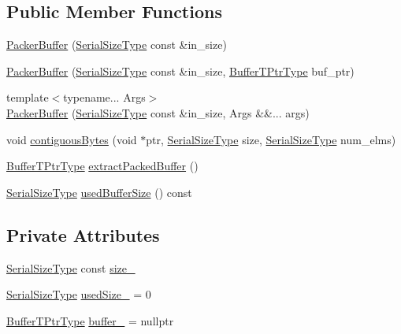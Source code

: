 \subsection*{Public Member Functions}
\begin{DoxyCompactItemize}
\item 
\hyperlink{structcheckpoint_1_1_packer_buffer_abd97aedeba81d8570fa047f3efb4220d}{Packer\+Buffer} (\hyperlink{namespacecheckpoint_a083f6674da3f94c2901b18c6d238217c}{Serial\+Size\+Type} const \&in\+\_\+size)
\item 
\hyperlink{structcheckpoint_1_1_packer_buffer_a4bdbbf8f84eb065c5c0b02d39a480308}{Packer\+Buffer} (\hyperlink{namespacecheckpoint_a083f6674da3f94c2901b18c6d238217c}{Serial\+Size\+Type} const \&in\+\_\+size, \hyperlink{structcheckpoint_1_1_packer_buffer_a081ec628050e8b173e413271fa070c26}{Buffer\+T\+Ptr\+Type} buf\+\_\+ptr)
\item 
{\footnotesize template$<$typename... Args$>$ }\\\hyperlink{structcheckpoint_1_1_packer_buffer_aded90d4aacc6376a95579d249751496d}{Packer\+Buffer} (\hyperlink{namespacecheckpoint_a083f6674da3f94c2901b18c6d238217c}{Serial\+Size\+Type} const \&in\+\_\+size, Args \&\&... args)
\item 
void \hyperlink{structcheckpoint_1_1_packer_buffer_aa8bf2d721f834a607a48164086aec078}{contiguous\+Bytes} (void $\ast$ptr, \hyperlink{namespacecheckpoint_a083f6674da3f94c2901b18c6d238217c}{Serial\+Size\+Type} size, \hyperlink{namespacecheckpoint_a083f6674da3f94c2901b18c6d238217c}{Serial\+Size\+Type} num\+\_\+elms)
\item 
\hyperlink{structcheckpoint_1_1_packer_buffer_a081ec628050e8b173e413271fa070c26}{Buffer\+T\+Ptr\+Type} \hyperlink{structcheckpoint_1_1_packer_buffer_abc144f3a5d61a7eb886bd57241e7ed7e}{extract\+Packed\+Buffer} ()
\item 
\hyperlink{namespacecheckpoint_a083f6674da3f94c2901b18c6d238217c}{Serial\+Size\+Type} \hyperlink{structcheckpoint_1_1_packer_buffer_a15b3ac40c21710da2f9813579c9a9c0e}{used\+Buffer\+Size} () const
\end{DoxyCompactItemize}
\subsection*{Private Attributes}
\begin{DoxyCompactItemize}
\item 
\hyperlink{namespacecheckpoint_a083f6674da3f94c2901b18c6d238217c}{Serial\+Size\+Type} const \hyperlink{structcheckpoint_1_1_packer_buffer_aac4e52e04c38fd611a6ed75e0d0df0a2}{size\+\_\+}
\item 
\hyperlink{namespacecheckpoint_a083f6674da3f94c2901b18c6d238217c}{Serial\+Size\+Type} \hyperlink{structcheckpoint_1_1_packer_buffer_ae20a1bc8f41e3af7e5b8ee3951f31353}{used\+Size\+\_\+} = 0
\item 
\hyperlink{structcheckpoint_1_1_packer_buffer_a081ec628050e8b173e413271fa070c26}{Buffer\+T\+Ptr\+Type} \hyperlink{structcheckpoint_1_1_packer_buffer_ab07bd403ce6f2e644ff92532f9e363cb}{buffer\+\_\+} = nullptr
\end{DoxyCompactItemize}
